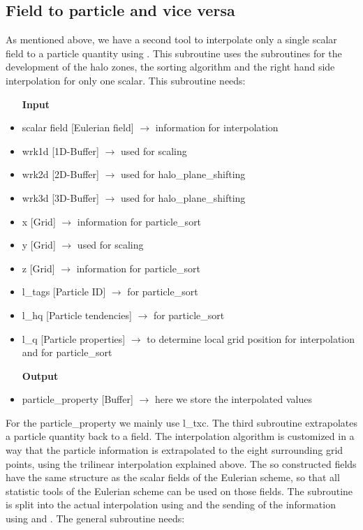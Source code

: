 \documentclass[12pt]{article}
\begin{document}
\subsection{Field to particle and vice versa}
As mentioned above, we have a second tool to interpolate only a single scalar field to a particle quantity using . This subroutine uses the subroutines for the development of the halo zones, the sorting algorithm and the right hand side interpolation for only one scalar. This subroutine needs:
\begin{itemize}
	\item [\textbf{Input}]
	\item scalar field [Eulerian field] $\rightarrow$ information for interpolation
	\item wrk1d [1D-Buffer] $\rightarrow$ used for scaling 
	\item wrk2d [2D-Buffer] $\rightarrow$ used for halo\_plane\_shifting
	\item wrk3d [3D-Buffer] $\rightarrow$ used for halo\_plane\_shifting
	\item x [Grid] $\rightarrow$ information for particle\_sort
	\item y [Grid] $\rightarrow$ used for scaling
	\item z [Grid] $\rightarrow$ information for particle\_sort
	\item l\_tags [Particle ID] $\rightarrow$ for particle\_sort
	\item l\_hq [Particle tendencies] $\rightarrow$ for particle\_sort
	\item l\_q [Particle properties] $\rightarrow$ to determine local grid position for interpolation and for particle\_sort
	\item [\textbf{Output}]
	\item particle\_property [Buffer] $\rightarrow$ here we store the interpolated values
\end{itemize}
For the particle\_property we mainly use l\_txc.\newline
The third subroutine extrapolates a particle quantity back to a field. The interpolation algorithm is customized in a way that the particle information is extrapolated to the eight surrounding grid points, using the trilinear interpolation explained above. The so constructed fields have the same structure as the scalar fields of the Eulerian scheme, so that all statistic tools of the Eulerian scheme can be used on those fields. The subroutine  is split into the actual interpolation using  and the sending of the information using  and . The general subroutine needs:
\end{document}
